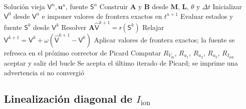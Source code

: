 \documentclass[11pt,a4paper]{article}
\newcommand{\Vm}{V_{\text{m}}}
\newcommand{\Iion}{I_{\mathrm{ion}}}
\newcommand{\Mmass}{\mathbf{M}}
\newcommand{\Lop}{\mathbf{L}}
\newcommand{\Aimp}{\mathbf{A}}
\newcommand{\Bimp}{\mathbf{B}}
\begin{document}
\begin{algorithm}[h!]
\caption{Acoplamiento no lineal de Picard}
\label{alg:picard}
\begin{algorithmic}[1]
\Require Solución vieja $\mathsf{V}^n,\mathbf{u}^n$, fuente $\mathsf{S}^n$
\State Construir $\Aimp$ y $\Bimp$ desde $\Mmass$, $\Lop$, $\theta$ y $\Delta t$
\State Inicializar $\mathsf{V}^0$ desde $\mathsf{V}^n$ e imponer valores de frontera exactos en $t^{n+1}$
  \State Evaluar estados y fuente $\mathsf{S}^k$ desde $\mathsf{V}^{k}$
  \State Resolver $\Aimp\widehat{\mathsf{V}}^{k+1}=\mathsf{r}(\mathsf{S}^k)$
  \State Relajar $\mathsf{V}^{k+1}=\mathsf{V}^{k}+\omega(\widehat{\mathsf{V}}^{k+1}-\mathsf{V}^{k})$
  \State Aplicar valores de frontera exactos; la fuente se refresca en el próximo corrector de Picard
  \State Computar $R_{\Vm}$, $R_{u_1}$, $R_{u_2}$, $R_{u_3}$, $R_{\Iion}$
    \State aceptar y salir del bucle
  \EndIf
\EndFor
\Ensure Se acepta el último iterado de Picard; se imprime una advertencia si no convergió
\end{algorithmic}
\end{algorithm}

\subsection{Linealización diagonal de \texorpdfstring{$\Iion$}{Iion}}
\label{sec:diagonal}
\end{document}
